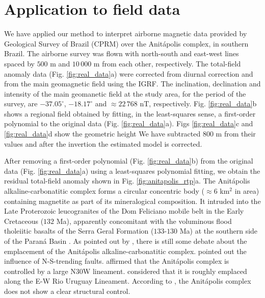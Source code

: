 \section{Application to field data}

We have applied our method to interpret airborne magnetic data provided by 
Geological Survey of Brazil (CPRM) over the Anit{\'a}polis complex, 
in southern Brazil. 
The airborne survey was flown with north-south and east-west lines spaced by $500$ m and $10\,000$ m from each other, respectively. 
The total-field anomaly data (Fig. \ref{fig:real_data}a) were corrected from diurnal correction and from the main geomagnetic field using the IGRF. 
The inclination, declination and intensity of the main geomanetic field at the study area, 
for the period of the survey, are $-37.05^{\circ}$, $-18.17^{\circ}$ and 
$\approx 22 \, 768 $ nT, respectively.
Fig. \ref{fig:real_data}b shows a regional field obtained by fitting, in the least-squares sense, a first-order polynomial to the original data (Fig. \ref{fig:real_data}a).
Figs \ref{fig:real_data}c and \ref{fig:real_data}d show the geometric height
We have subtracted 800 m from their values and after the invertion the estimated model is corrected.  

After removing a first-order polynomial (Fig. \ref{fig:real_data}b) from the original data  
(Fig. \ref{fig:real_data}a) using a least-squares polynomial fitting, we obtain the residual total-field anomaly shown in Fig. \ref{fig:anitapolis_rtp}a.
The Anit{\'a}polis alkaline-carbonatitic complex forms a circular concentric body 
($\approx 6$ km$^{2}$ in area) containing magnetite as part of its mineralogical 
composition. 
It intruded into the Late Proterozoic leucogranites of the Dom Feliciano 
mobile belt in the Early Cretaceous ($132$ Ma), apparently concomitant with the 
voluminous flood tholeiitic basalts of the Serra Geral Formation ($133$-$130$ Ma) 
at the southern side of the Paran{\'a} Basin \citep{gibson-1999, scheibe-etal2005}.
As pointed out by \citet{GOMES2018}, there is still some debate about the emplacement 
of the Anit{\'a}polis alkaline-carbonatitic complex. 
\citet{melcher-coutinho1966} pointed out the influence of N-S-trending faults.
\citet{horbach-marimon1980} affirmed that the Anit{\'a}polis complex is controlled by 
a large N30W lineament. 
\citet{scheibe-etal2005} considered that it is roughly emplaced along the E-W Rio 
Uruguay Lineament. 
According to \citet{riccomini-etal2005}, the Anit{\'a}polis 
complex does not show a clear structural control. 

